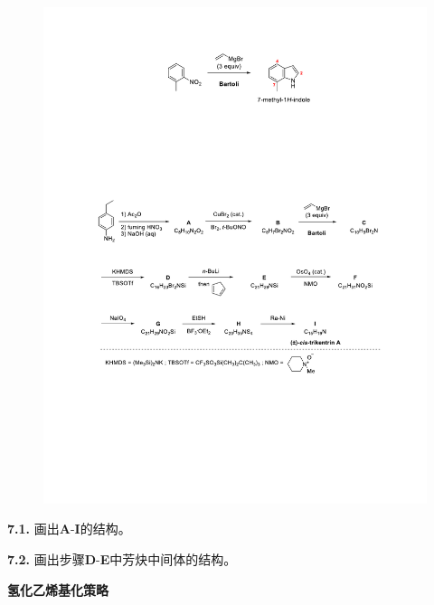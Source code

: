 \begin{figure}[h]
	\centering
	\includegraphics[width=16cm]{./pic/t7-3.pdf}
\end{figure}

\noindent\textbf{7.1.} 画出\textbf{A}-\textbf{I}的结构。

\noindent\textbf{7.2.} 画出步骤\textbf{D}-\textbf{E}中芳炔中间体的结构。

\noindent\textbf{氢化乙烯基化策略}

